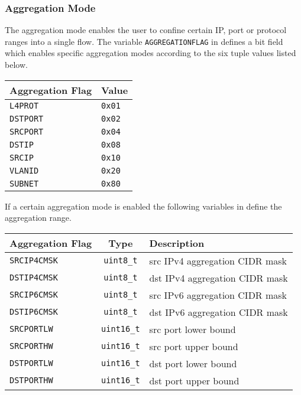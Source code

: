 \subsubsection{Aggregation Mode}
The aggregation mode enables the user to confine certain IP, port or protocol ranges into a single flow. The variable {\tt AGGREGATIONFLAG} in  defines a
bit field which enables specific aggregation modes according to the six tuple values listed below.
\begin{longtable}{ll}
    \toprule
    {\bf Aggregation Flag} & {\bf Value} \\
    \midrule\endhead%
    {\tt L4PROT}  & {\tt 0x01} \\
    {\tt DSTPORT} & {\tt 0x02} \\
    {\tt SRCPORT} & {\tt 0x04} \\
    {\tt DSTIP}   & {\tt 0x08} \\
    {\tt SRCIP}   & {\tt 0x10} \\
    {\tt VLANID}  & {\tt 0x20} \\
    {\tt SUBNET}  & {\tt 0x80} \\
    \bottomrule
\end{longtable}
If a certain aggregation mode is enabled the following variables in 
define the aggregation range.
\begin{longtable}{lcl}
    \toprule
    {\bf Aggregation Flag} & {\bf Type} & {\bf Description}\\
    \midrule\endhead%
    {\tt SRCIP4CMSK} & {\tt uint8\_t}  & src IPv4 aggregation CIDR mask \\
    {\tt DSTIP4CMSK} & {\tt uint8\_t}  & dst IPv4 aggregation CIDR mask \\
    {\tt SRCIP6CMSK} & {\tt uint8\_t}  & src IPv6 aggregation CIDR mask \\
    {\tt DSTIP6CMSK} & {\tt uint8\_t}  & dst IPv6 aggregation CIDR mask \\
    {\tt SRCPORTLW}  & {\tt uint16\_t} & src port lower bound \\
    {\tt SRCPORTHW}  & {\tt uint16\_t} & src port upper bound \\
    {\tt DSTPORTLW}  & {\tt uint16\_t} & dst port lower bound \\
    {\tt DSTPORTHW}  & {\tt uint16\_t} & dst port upper bound \\
    \bottomrule
\end{longtable}

